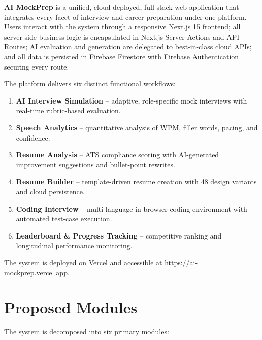 \documentclass[12pt,a4paper,oneside]{report}
\begin{document}
\textbf{AI MockPrep} is a unified, cloud-deployed, full-stack web application that integrates every facet of interview and career preparation under one platform. Users interact with the system through a responsive Next.js 15 frontend; all server-side business logic is encapsulated in Next.js Server Actions and API Routes; AI evaluation and generation are delegated to best-in-class cloud APIs; and all data is persisted in Firebase Firestore with Firebase Authentication securing every route.

The platform delivers six distinct functional workflows:
\begin{enumerate}
  \item \textbf{AI Interview Simulation} -- adaptive, role-specific mock interviews with real-time rubric-based evaluation.
  \item \textbf{Speech Analytics} -- quantitative analysis of WPM, filler words, pacing, and confidence.
  \item \textbf{Resume Analysis} -- ATS compliance scoring with AI-generated improvement suggestions and bullet-point rewrites.
  \item \textbf{Resume Builder} -- template-driven resume creation with 48 design variants and cloud persistence.
  \item \textbf{Coding Interview} -- multi-language in-browser coding environment with automated test-case execution.
  \item \textbf{Leaderboard \& Progress Tracking} -- competitive ranking and longitudinal performance monitoring.
\end{enumerate}

The system is deployed on Vercel and accessible at \url{https://ai-mockprep.vercel.app}.


\section{Proposed Modules}
\label{sec:proposed_modules}

The system is decomposed into six primary modules:
\end{document}
